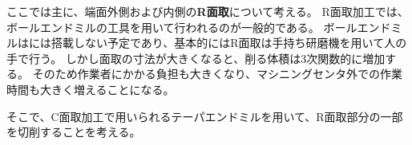 

ここでは主に、端面外側および内側の\textbf{R面取}について考える。
R面取加工では、ボールエンドミルの工具を用いて行われるのが一般的である。
ボールエンドミルは\DMname には搭載しない予定であり、基本的にはR面取は手持ち研磨機を用いて人の手で行う。
しかし面取の寸法が大きくなると、削る体積は3次関数的に増加する。
そのため作業者にかかる負担も大きくなり、マシニングセンタ外での作業時間も大きく増えることになる。

そこで、C面取加工で用いられるテーパエンドミルを用いて、R面取部分の一部を切削することを考える。



